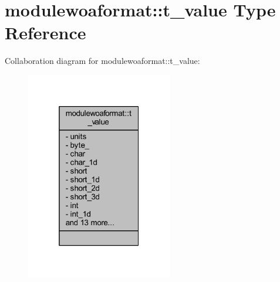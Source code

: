 \hypertarget{structmodulewoaformat_1_1t__value}{}\section{modulewoaformat\+:\+:t\+\_\+value Type Reference}
\label{structmodulewoaformat_1_1t__value}


Collaboration diagram for modulewoaformat\+:\+:t\+\_\+value\+:\nopagebreak
\begin{figure}[H]
\begin{center}
\leavevmode
\includegraphics[width=181pt]{structmodulewoaformat_1_1t__value__coll__graph}
\end{center}
\end{figure}

